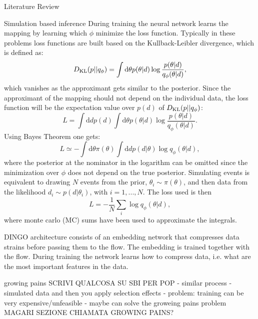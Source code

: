 \documentclass[a4paper, 12pt, twoside, openright, titlepage]{book}
\begin{document}
\begin{chapter}{Literature Review}
\begin{section}{Simulation based inference}
During training the neural network learns the mapping by learning which $\phi$ minimize the loss function.
Typically in these problems loss functions are built based on the Kullback-Leibler divergence, which is defined as:
\begin{equation}
D_{\rm KL}(p||q_{\phi}) = \int \textrm{d}\theta p(\theta|d) \log{\frac{p(\theta|d)}{q_{\phi}(\theta|d)}},
\end{equation}
which vanishes as the approximant gets similar to the posterior.
Since the approximant of the mapping should not depend on the individual data, the loss function will be the expectation value over $p(d)$ of $D_{\rm KL}(p||q_{\phi})$:
\begin{equation}
L  = \int \textrm{d}{d}p(d)\int \textrm{d}\theta p(\theta|d) \log{\frac{p(\theta|d)}{q_{\phi}(\theta|d)}}.
\end{equation}
Using Bayes Theorem one gets:
\begin{equation}
L  \simeq - \int \textrm{d}\theta \pi(\theta) \int\textrm{d}{d} p(d|\theta)\log{q_{\phi}(\theta|d)}, 
\end{equation}
where the posterior at the nominator in the logarithm can be omitted since the minimization over $\phi$ does not depend on the true posterior.
Simulating events is equivalent to drawing $N$ events from the prior, $\theta_{i}\sim \pi(\theta)$, and then data from the likelihood $d_{i} \sim p(d|\theta_{i})$, with $i=1,...,N$.
The loss used is then
\begin{equation}
L = - \frac{1}{N} \sum_{i} \log{q_{\phi}(\theta|d)},
\end{equation}
where monte carlo (MC) sums have been used to approximate the integrals.

DINGO architecture consists of an embedding network that compresses data strains before passing them to the flow. 
The embedding is trained together with the flow. 
During training the network learns how to compress data, i.e. what are the most important features in the data.



\end{section}

\begin{section}{growing pains}
SCRIVI QUALCOSA SU SBI PER POP
- similar process
- simulated data and then you apply selection effects
- problem: training can be very expensive/unfeasible
- maybe can solve the groweing pains problem
MAGARI SEZIONE CHIAMATA GROWING PAINS?

\end{section}












\end{chapter}
\end{document}

